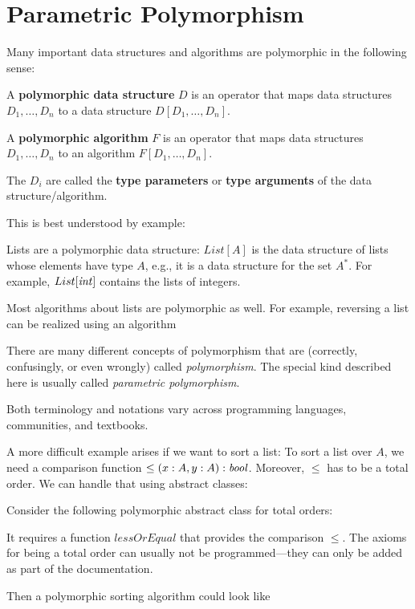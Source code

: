 \section{Parametric Polymorphism}

Many important data structures and algorithms are polymorphic in the following sense:

\begin{definition}[Polymorphism]
A \textbf{polymorphic data structure} $D$ is an operator that maps data structures $D_1,\ldots,D_n$ to a data structure $D[D_1,\ldots,D_n]$.

A \textbf{polymorphic algorithm} $F$ is an operator that maps data structures $D_1,\ldots,D_n$ to an algorithm $F[D_1,\ldots,D_n]$.

The $D_i$ are called the \textbf{type parameters} or \textbf{type arguments} of the data structure/algorithm.
\end{definition}

This is best understood by example:

\begin{example}[Lists]
Lists are a polymorphic data structure: $List[A]$ is the data structure of lists whose elements have type $A$, e.g., it is a data structure for the set $A^*$.
For example, $List[\mathit{int}]$ contains the lists of integers.

Most algorithms about lists are polymorphic as well.
For example, reversing a list can be realized using an algorithm
\begin{acode}
\end{acode}
\end{example}

\begin{terminology}
There are many different concepts of polymorphism that are (correctly, confusingly, or even wrongly) called \emph{polymorphism}.
The special kind described here is usually called \emph{parametric polymorphism}.

Both terminology and notations vary across programming languages, communities, and textbooks.
\end{terminology}

A more difficult example arises if we want to sort a list: To sort a list over $A$, we need a comparison function $\leq(x:A,y:A):\mathit{bool}$.
Moreover, $\leq$ has to be a total order.
We can handle that using abstract classes:

\begin{example}
Consider the following polymorphic abstract class for total orders:
\begin{acode}
\end{acode}
It requires a function $lessOrEqual$ that provides the comparison $\leq$.
The axioms for being a total order can usually not be programmed---they can only be added as part of the documentation.

Then a polymorphic sorting algorithm could look like
\begin{acode}
\end{acode}
\end{example}


